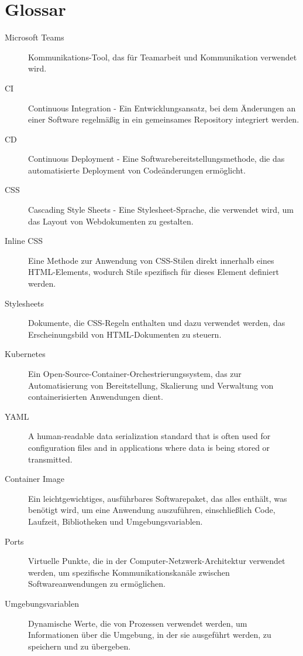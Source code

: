 \newpage
\section*{Glossar}
\begin{description}
    \item[\hypertarget{MicrosoftTeams}{Microsoft Teams}] Kommunikations-Tool, das für Teamarbeit und Kommunikation verwendet wird.
    \item[\hypertarget{CI}{CI}] Continuous Integration - Ein Entwicklungsansatz, bei dem Änderungen an einer Software regelmäßig in ein gemeinsames Repository integriert werden.
    \item[\hypertarget{CD}{CD}] Continuous Deployment - Eine Softwarebereitstellungsmethode, die das automatisierte Deployment von Codeänderungen ermöglicht.
    \item[\hypertarget{CSS}{CSS}] Cascading Style Sheets - Eine Stylesheet-Sprache, die verwendet wird, um das Layout von Webdokumenten zu gestalten.
    \item[\hypertarget{InlineCSS}{Inline CSS}] Eine Methode zur Anwendung von CSS-Stilen direkt innerhalb eines HTML-Elements, wodurch Stile spezifisch für dieses Element definiert werden.
    \item[\hypertarget{Stylesheets}{Stylesheets}] Dokumente, die CSS-Regeln enthalten und dazu verwendet werden, das Erscheinungsbild von HTML-Dokumenten zu steuern.
    \item[\hypertarget{Kubernetes}{Kubernetes}] Ein Open-Source-Container-Orchestrierungssystem, das zur Automatisierung von Bereitstellung, Skalierung und Verwaltung von containerisierten Anwendungen dient.
    \item[\hypertarget{YAML}{YAML}] A human-readable data serialization standard that is often used for configuration files and in applications where data is being stored or transmitted.
    \item[\hypertarget{ContainerImage}{Container Image}] Ein leichtgewichtiges, ausführbares Softwarepaket, das alles enthält, was benötigt wird, um eine Anwendung auszuführen, einschließlich Code, Laufzeit, Bibliotheken und Umgebungsvariablen.
    \item[\hypertarget{Ports}{Ports}] Virtuelle Punkte, die in der Computer-Netzwerk-Architektur verwendet werden, um spezifische Kommunikationskanäle zwischen Softwareanwendungen zu ermöglichen.
    \item[\hypertarget{Umgebungsvariablen}{Umgebungsvariablen}] Dynamische Werte, die von Prozessen verwendet werden, um Informationen über die Umgebung, in der sie ausgeführt werden, zu speichern und zu übergeben.

\end{description}
